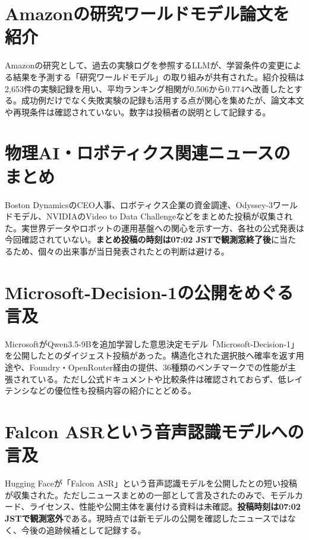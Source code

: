 \section{Amazonの研究ワールドモデル論文を紹介}
Amazonの研究として、過去の実験ログを参照するLLMが、学習条件の変更による結果を予測する「研究ワールドモデル」の取り組みが共有された。紹介投稿は2,653件の実験記録を用い、平均ランキング相関が0.506から0.774へ改善したとする。成功例だけでなく失敗実験の記録も活用する点が関心を集めたが、論文本文や再現条件は確認されていない。数字は投稿者の説明として記録する。

\section{物理AI・ロボティクス関連ニュースのまとめ}
Boston DynamicsのCEO人事、ロボティクス企業の資金調達、Odyssey-3ワールドモデル、NVIDIAのVideo to Data Challengeなどをまとめた投稿が収集された。実世界データやロボットの運用基盤への関心を示す一方、各社の公式発表は今回確認されていない。\textbf{まとめ投稿の時刻は07:02 JSTで観測窓終了後}に当たるため、個々の出来事が当日発表されたとの判断は避ける。

\section{Microsoft-Decision-1の公開をめぐる言及}
MicrosoftがQwen3.5-9Bを追加学習した意思決定モデル「Microsoft-Decision-1」を公開したとのダイジェスト投稿があった。構造化された選択肢へ確率を返す用途や、Foundry・OpenRouter経由の提供、36種類のベンチマークでの性能が主張されている。ただし公式ドキュメントや比較条件は確認されておらず、低レイテンシなどの優位性も投稿内容の紹介にとどめる。

\section{Falcon ASRという音声認識モデルへの言及}
Hugging Faceが「Falcon ASR」という音声認識モデルを公開したとの短い投稿が収集された。ただしニュースまとめの一部として言及されたのみで、モデルカード、ライセンス、性能や公開主体を裏付ける資料は未確認。\textbf{投稿時刻は07:02 JSTで観測窓外}である。現時点では新モデルの公開を確認したニュースではなく、今後の追跡候補として記録する。

